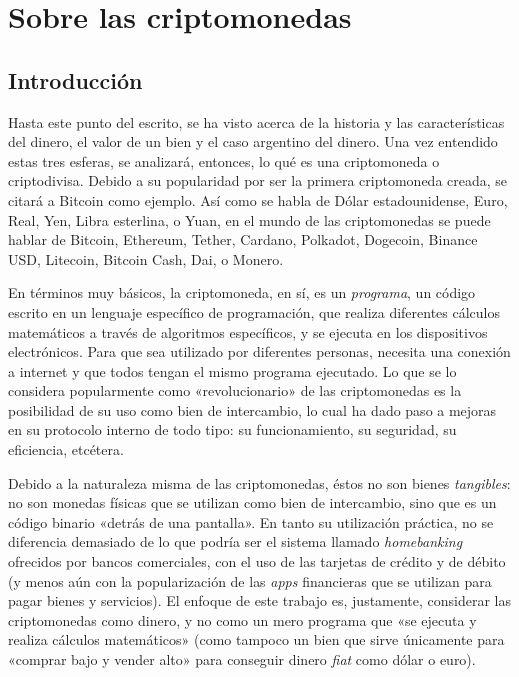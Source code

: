 \documentclass[12pt,a4paper,twoside]{book}
\begin{document}
\part{Sobre las criptomonedas}

\chapter{Introducción}
Hasta este punto del escrito, se ha visto acerca de la historia y las características del dinero, el valor de un bien y el caso argentino del dinero. Una vez entendido estas tres esferas, se analizará, entonces, lo qué es una criptomoneda o criptodivisa. Debido a su popularidad por ser la primera criptomoneda creada, se citará a Bitcoin como ejemplo. Así como se habla de Dólar estadounidense, Euro, Real, Yen, Libra esterlina, o Yuan, en el mundo de las criptomonedas se puede hablar de Bitcoin, Ethereum, Tether, Cardano, Polkadot, Dogecoin, Binance USD, Litecoin, Bitcoin Cash, Dai, o Monero.

En términos muy básicos, la criptomoneda, en sí, es un \textit{programa}, un código escrito en un lenguaje específico de programación, que realiza diferentes cálculos matemáticos a través de algoritmos específicos, y se ejecuta en los dispositivos electrónicos. Para que sea utilizado por diferentes personas, necesita una conexión a internet y que todos tengan el mismo programa ejecutado. Lo que se lo considera popularmente como «revolucionario» de las criptomonedas es la posibilidad de su uso como bien de intercambio, lo cual ha dado paso a mejoras en su protocolo interno de todo tipo: su funcionamiento, su seguridad, su eficiencia, etcétera.

Debido a la naturaleza misma de las criptomonedas, éstos no son bienes \textit{tangibles}: no son monedas físicas que se utilizan como bien de intercambio, sino que es un código binario «detrás de una pantalla». En tanto su utilización práctica, no se diferencia demasiado de lo que podría ser el sistema llamado \textit{homebanking} ofrecidos por bancos comerciales, con el uso de las tarjetas de crédito y de débito (y menos aún con la popularización de las \textit{apps} financieras que se utilizan para pagar bienes y servicios). El enfoque de este trabajo es, justamente, considerar las criptomonedas como dinero, y no como un mero programa que «se ejecuta y realiza cálculos matemáticos» (como tampoco un bien que sirve únicamente para «comprar bajo y vender alto» para conseguir dinero \textit{fiat} como dólar o euro).
\end{document}

